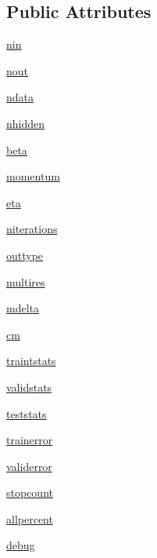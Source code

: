 \subsection*{Public Attributes}
\begin{DoxyCompactItemize}
\item 
\hyperlink{classmlp_1_1mlp_a2769bdf0e5833e3999418868122feb28}{nin}
\item 
\hyperlink{classmlp_1_1mlp_a063008228bc8423626c2fa6e9a2664e9}{nout}
\item 
\hyperlink{classmlp_1_1mlp_a463f6e1b39fb817f6a302e522e591516}{ndata}
\item 
\hyperlink{classmlp_1_1mlp_aa34217744fa9bc0bf1e8a3b358ed0c96}{nhidden}
\item 
\hyperlink{classmlp_1_1mlp_a2f75a4b3429e0307568fc45d7e6950da}{beta}
\item 
\hyperlink{classmlp_1_1mlp_a3a4586ea27492667965ae101786a1fc8}{momentum}
\item 
\hyperlink{classmlp_1_1mlp_a1b81b434ce0227f55d266dbb4c1e03a1}{eta}
\item 
\hyperlink{classmlp_1_1mlp_a79bb54ad6f2b84903e62c0b5f5eb7344}{niterations}
\item 
\hyperlink{classmlp_1_1mlp_ad85e6054d661877c130574e54434ce16}{outtype}
\item 
\hyperlink{classmlp_1_1mlp_aa43f6dfd1707a355a974181d013e8f00}{multires}
\item 
\hyperlink{classmlp_1_1mlp_a6a417dee0a55db5f56349db1249a3ec9}{mdelta}
\item 
\hyperlink{classmlp_1_1mlp_a0573cbd708236e8af5fb46edc9c36660}{cm}
\item 
\hyperlink{classmlp_1_1mlp_a93598c8f15a234b94c33a853527bec31}{traintstats}
\item 
\hyperlink{classmlp_1_1mlp_a6ede6eef42e61e87fd2e79cf61529688}{validstats}
\item 
\hyperlink{classmlp_1_1mlp_a60e5b36a360073418d45d221ff5c47f2}{teststats}
\item 
\hyperlink{classmlp_1_1mlp_a4e81b494e111fb2c72000efbaa647963}{trainerror}
\item 
\hyperlink{classmlp_1_1mlp_a778e5d4e1b507b330dcb6804455ac416}{validerror}
\item 
\hyperlink{classmlp_1_1mlp_aa9d78571a75937654b1dbb2c78960aa1}{stopcount}
\item 
\hyperlink{classmlp_1_1mlp_aab9e6c1e9b3661fa3f276d09baf27144}{allpercent}
\item 
\hyperlink{classmlp_1_1mlp_a21e9d80982176c49feb06586010fa686}{debug}

\end{DoxyCompactItemize}
